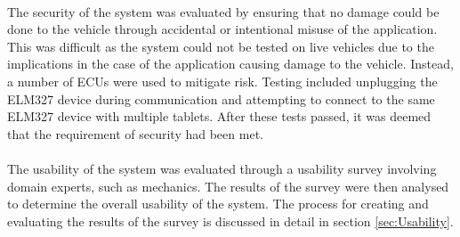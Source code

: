 	\paragraph{}{
	The security of the system was evaluated by ensuring that no damage could be done to the vehicle through accidental or intentional misuse of the application. This was difficult as the system could not be tested on live vehicles due to the implications in the case of the application causing damage to the vehicle. Instead, a number of ECUs were used to mitigate risk. Testing included unplugging the ELM327 device during communication and attempting to connect to the same ELM327 device with multiple tablets. After these tests passed, it was deemed that the requirement of security had been met.
	}
	\paragraph{}{
	The usability of the system was evaluated through a usability survey involving domain experts, such as mechanics. The results of the survey were then analysed to determine the overall usability of the system. The process for creating and evaluating the results of the survey is discussed in detail in section \ref{sec:Usability}.
	}
	
